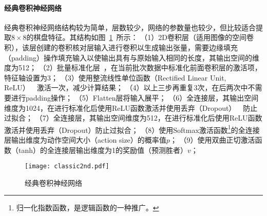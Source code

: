 \paragraph{经典卷积神经网络}
经典卷积神经网络结构较为简单，层数较少，网络的参数量也较少，但比较适合提取$8\times8$的棋盘特征。其结构如图~\ref{fig:cnn}~所示：
（1）2D卷积层（适用图像的空间卷积），该层创建的卷积核对层输入进行卷积以生成输出张量，需要边缘填充（padding）操作填充输入以使输出具有与原始输入相同的长度，其输出空间的维度为512；
（2）批量标准化层~\cite{batchnorm}，在当前批次数据中标准化前面卷积层的激活项，特征轴设置为3；
（3）使用整流线性单位函数（Rectified Linear Unit, ReLU）~\cite{xu2015empirical}~激活一次，减少计算结果；
（4）以上三步再重复3次，在后两次中不需要进行padding操作；
（5）Flatten层将输入展平；
（6）全连接层，其输出空间维度为1024，在进行标准化后使用ReLU函数激活并使用丢弃（Dropout）~\cite{srivastava2014dropout}~防止过拟合；
（7）全连接层，其输出空间维度为512，在进行标准化后使用ReLU函数激活并使用丢弃（Dropout）防止过拟合；
（8）使用Softmax激活函数\footnote{归一化指数函数，是逻辑函数的一种推广。}的全连接层输出维度为动作空间大小（action size）的概率值$p$；
（9）使用双曲正切激活函数（tanh）的全连接层输出维度为1的奖励值（预测胜者）$v$；
\begin{figure}[H]
    \centering
    \texttt{[image: classic2nd.pdf]}
    \caption[cnn]{%
    经典卷积神经网络%
      }
    \label{fig:cnn}
\end{figure}
